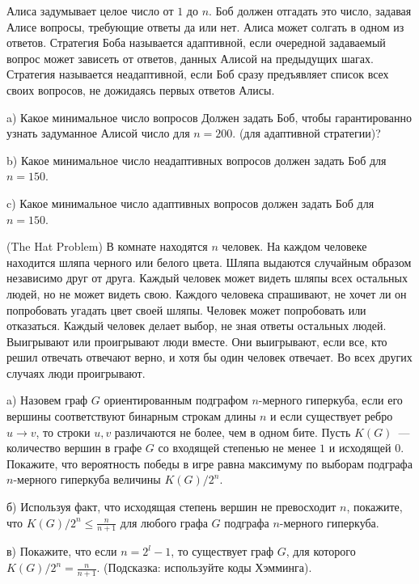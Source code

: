 \setcounter{curtask}{51}


\begin{task}
	Алиса задумывает целое число от $1$ до $n$. Боб должен отгадать это число,
    задавая Алисе вопросы, требующие ответы да или нет. Алиса может солгать в одном
    из ответов. Стратегия Боба называется адаптивной, если очередной задаваемый
    вопрос может зависеть от ответов, данных Алисой на предыдущих шагах. Стратегия
    называется неадаптивной, если Боб сразу предъявляет список всех своих вопросов,
    не дожидаясь первых ответов Алисы.

	a) Какое минимальное число вопросов Должен задать Боб, чтобы гарантированно
    узнать задуманное Алисой число для $n = 200$. (для адаптивной стратегии)?
    
	b) Какое минимальное число неадаптивных вопросов должен задать Боб для $n = 150$.
    
	c) Какое минимальное число адаптивных вопросов должен задать Боб для $n = 150$.
\end{task}

\begin{task} (The Hat Problem)
    В комнате находятся $n$ человек. На каждом человеке находится шляпа черного или
    белого цвета. Шляпа выдаются случайным образом независимо друг от друга. Каждый
    человек может видеть шляпы всех остальных людей, но не может видеть свою. Каждого
    человека спрашивают, не хочет ли он попробовать угадать цвет своей шляпы. Человек
    может попробовать или отказаться. Каждый человек делает выбор, не зная ответы
    остальных людей. Выигрывают или проигрывают люди вместе. Они выигрывают, если
    все, кто решил отвечать отвечают верно, и хотя бы один человек отвечает. Во всех
    других случаях люди проигрывают.

	a) Назовем граф $G$ ориентированным подграфом $n$-мерного гиперкуба, если его
    вершины соответствуют бинарным строкам длины $n$ и если существует ребро $u
    \rightarrow v$, то строки $u, v$ различаются не более, чем в одном бите. Пусть
    $K(G)$~--- количество вершин в графе $G$ со входящей степенью не менее $1$ и
    исходящей $0$. Покажите, что вероятность победы в игре равна максимуму по выборам
    подграфа $n$-мерного гиперкуба величины $K(G) / 2^n$.

    б) Используя факт, что исходящая степень вершин не превосходит $n$, покажите, что
    $K(G) / 2^n \le \frac{n}{n + 1}$ для любого графа $G$ подграфа $n$-мерного
    гиперкуба.

    в) Покажите, что если $n = 2^l - 1$, то существует граф $G$, для которого
	$K(G) / 2^n = \frac{n}{n + 1}$. (Подсказка: используйте коды Хэмминга).
\end{task}

